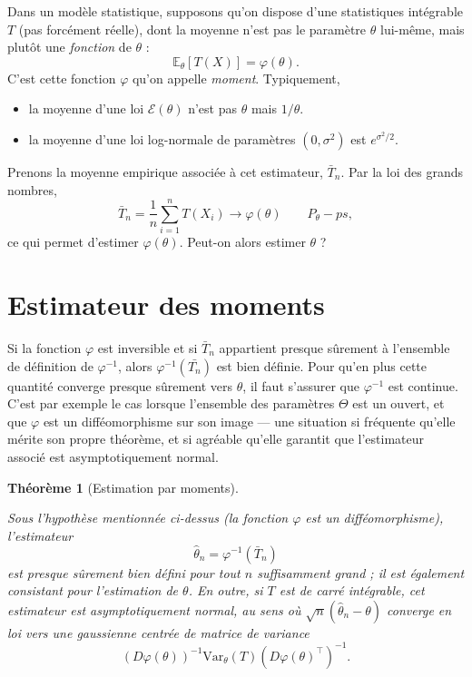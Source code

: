 \documentclass[
  10,
  letterpaper,
  DIV=11,
  numbers=noendperiod]{scrreport}
\providecommand{\tightlist}{%
  \setlength{\itemsep}{0pt}\setlength{\parskip}{0pt}}\usepackage{longtable,booktabs,array}
\theoremstyle{plain}
\newtheorem{theorem}{Théorème}[chapter]
\theoremstyle{definition}
\theoremstyle{plain}
\theoremstyle{definition}
\theoremstyle{definition}
\theoremstyle{plain}
\theoremstyle{remark}
\begin{document}
Dans un modèle statistique, supposons qu'on dispose d'une statistiques
intégrable \(T\) (pas forcément réelle), dont la moyenne n'est pas le
paramètre \(\theta\) lui-même, mais plutôt une \emph{fonction} de
\(\theta\) :\\
\[\mathbb{E}_\theta[T(X)] = \varphi(\theta).\] C'est cette fonction
\(\varphi\) qu'on appelle \emph{moment}. Typiquement,

\begin{itemize}
\tightlist
\item
  la moyenne d'une loi \(\mathscr{E}(\theta)\) n'est pas \(\theta\) mais
  \(1/\theta\).
\item
  la moyenne d'une loi log-normale de paramètres \((0, \sigma^2)\) est
  \(e^{\sigma^2/2}\).
\end{itemize}

Prenons la moyenne empirique associée à cet estimateur, \(\bar{T}_n\).
Par la loi des grands nombres,
\[\bar{T}_n = \frac{1}{n}\sum_{i=1}^n T(X_i) \to \varphi(\theta) \qquad P_\theta-ps, \]
ce qui permet d'estimer \(\varphi(\theta)\). Peut-on alors estimer
\(\theta\) ?

\hypertarget{estimateur-des-moments}{%
\section{Estimateur des moments}\label{estimateur-des-moments}}

Si la fonction \(\varphi\) est inversible et si \(\bar{T}_n\) appartient
presque sûrement à l'ensemble de définition de \(\varphi^{-1}\), alors
\(\varphi^{-1}(\bar{T_n})\) est bien définie. Pour qu'en plus cette
quantité converge presque sûrement vers \(\theta\), il faut s'assurer
que \(\varphi^{-1}\) est continue. C'est par exemple le cas lorsque
l'ensemble des paramètres \(\Theta\) est un ouvert, et que \(\varphi\)
est un difféomorphisme sur son image --- une situation si fréquente
qu'elle mérite son propre théorème, et si agréable qu'elle garantit que
l'estimateur associé est asymptotiquement normal.

\begin{theorem}[Estimation par
moments]\protect\hypertarget{thm-mom}{}\label{thm-mom}

Sous l'hypothèse mentionnée ci-dessus (la fonction \(\varphi\) est un
difféomorphisme), l'estimateur
\[\hat{\theta}_n = \varphi^{-1}(\bar{T}_n)\] est presque sûrement bien
défini pour tout \(n\) suffisamment grand ; il est également consistant
pour l'estimation de \(\theta\). En outre, si \(T\) est de carré
intégrable, cet estimateur est asymptotiquement normal, au sens où
\(\sqrt{n}(\hat{\theta}_n - \theta)\) converge en loi vers une
gaussienne centrée de matrice de variance
\[ (D\varphi(\theta))^{-1}\mathrm{Var}_\theta(T)(D\varphi(\theta)^\top)^{-1}.\]

\end{theorem}
\end{document}
